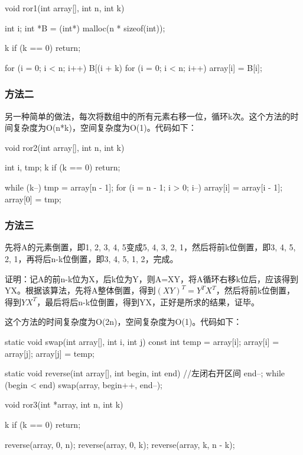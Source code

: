 \begin{Codex}[label=ror.c]
void ror1(int array[], int n, int k) {
    int i;
    int *B = (int*) malloc(n * sizeof(int));

    k %
    if (k == 0)
        return;

    for (i = 0; i < n; i++) {
        B[(i + k) %
    }
    for (i = 0; i < n; i++) {
        array[i] = B[i];
    }
}
\end{Codex}

\subsubsection{方法二}
另一种简单的做法，每次将数组中的所有元素右移一位，循环k次。这个方法的时间复杂度为O(n*k)，空间复杂度为O(1)。代码如下：

\begin{Codex}[label=ror.c]
void ror2(int array[], int n, int k) {
    int i, tmp;
    k %
    if (k == 0)
        return;

    while (k--) {
        tmp = array[n - 1];
        for (i = n - 1; i > 0; i--) {
            array[i] = array[i - 1];
        }
        array[0] = tmp;
    }
}
\end{Codex}

\subsubsection{方法三}
先将A的元素倒置，即{1, 2, 3, 4, 5}变成{5, 4, 3, 2, 1}，然后将前k位倒置，即{3, 4, 5, 2, 1}，再将后n-k位倒置，即{3, 4, 5, 1, 2}，完成。

证明：记A的前n-k位为X，后k位为Y，则A=XY，将A循环右移k位后，应该得到YX。根据该算法，先将A整体倒置，得到$(XY)^T=Y^TX^T$，然后将前k位倒置，得到$YX^T$，最后将后n-k位倒置，得到YX，正好是所求的结果，证毕。

这个方法的时间复杂度为O(2n)，空间复杂度为O(1)。代码如下：

\begin{Codex}[label=ror.c]
static void swap(int array[], int i, int j) {
    const int temp = array[i];
    array[i] = array[j];
    array[j] = temp;
}

static void reverse(int array[], int begin, int end) { //左闭右开区间
    end--;
    while (begin < end)
        swap(array, begin++, end--);
}

void ror3(int *array, int n, int k) {
    k %
    if (k == 0)
        return;

    reverse(array, 0, n);
    reverse(array, 0, k);
    reverse(array, k, n - k);
}
\end{Codex}

